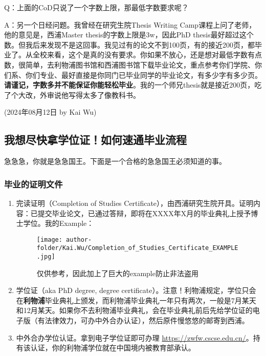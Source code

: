 Q：上面的CoD只说了一个字数上限，那最低字数要求呢？

A：另一个日经问题。我曾经在研究生院Thesis Writing Camp课程上问了老师，他的意见是，西浦Master thesis的字数上限是3w，因此PhD thesis最好超过这个数。但我后来发现不是这回事。我见过有的论文不到100页，有的接近200页，都毕业了。从全校来看，这个是真的没有要求。你如果不放心，还是想对最低字数有点数，很简单，去利物浦图书馆和西浦图书馆下载毕业论文，重点参考你们学院、你们系、你们专业、最好直接是你同门已毕业同学的毕业论文，有多少字有多少页。\textbf{请谨记，字数多并不能保证你能轻松毕业}。我的一个师兄thesis就是接近200页，吃了个大改，外审说他写得太多了像教科书。

\begin{flushright}
    (2024年08月12日 by Kai Wu)
\end{flushright}



\subsection{我想尽快拿学位证！如何速通毕业流程}

急急急，你就是急急国王。下面是一个合格的急急国王必须知道的事。

\subsubsection{毕业的证明文件}

\begin{enumerate}
    \item 完读证明（Completion of Studies Certificate），由西浦研究生院开具。证明内容：已提交毕业论文，已通过答辩，即将在XXXX年X月的毕业典礼上授予博士学位。我的Example：
    \begin{figure}[H]
        \centering
        \texttt{[image: author-folder/Kai.Wu/Completion\_of\_Studies\_Certificate\_EXAMPLE.jpg]}
        \caption{仅供参考，因此加上了巨大的example防止非法盗用}
    \end{figure}
    \item 学位证（aka PhD degree, degree certificate）。注意！利物浦规定，学位只会在\textbf{利物浦}毕业典礼上颁发，而利物浦毕业典礼一年只有两次，一般是7月某天和12月某天。如果你不去利物浦毕业典礼，会在毕业典礼前后先给学位证的电子版（有法律效力，可办中外合办认证），然后原件慢悠悠的邮寄到西浦。
    \item 中外合办学位认证。拿到电子学位证即可办理 \url{https://zwfw.cscse.edu.cn/}。持有该认证，你的利物浦学位就在中国境内被教育部承认。
\end{enumerate}

